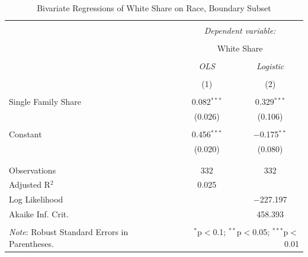 \documentclass[11pt]{article}
\begin{document}
\begin{table}[!htbp] \centering 
  \caption{Bivariate Regressions of White Share on Race, Boundary Subset} 
  \label{tab:naive_biv_causal} 
\begin{tabular}{@{\extracolsep{5pt}}lcc} 
\\[-1.8ex]\hline 
\hline \\[-1.8ex] 
 & \multicolumn{2}{c}{\textit{Dependent variable:}} \\ 
\cline{2-3} 
\\[-1.8ex] & \multicolumn{2}{c}{White Share} \\ 
\\[-1.8ex] & \textit{OLS} & \textit{Logistic} \\ 
\\[-1.8ex] & (1) & (2)\\ 
\hline \\[-1.8ex] 
 Single Family Share & 0.082$^{***}$ & 0.329$^{***}$ \\ 
  & (0.026) & (0.106) \\ 
  & & \\ 
 Constant & 0.456$^{***}$ & $-$0.175$^{**}$ \\ 
  & (0.020) & (0.080) \\ 
  & & \\ 
\hline \\[-1.8ex] 
Observations & 332 & 332 \\ 
Adjusted R$^{2}$ & 0.025 &  \\ 
Log Likelihood &  & $-$227.197 \\ 
Akaike Inf. Crit. &  & 458.393 \\ 
\hline 
\hline \\[-1.8ex] 
\textit{Note}: Robust Standard Errors in Parentheses.  & \multicolumn{2}{r}{$^{*}$p$<$0.1; $^{**}$p$<$0.05; $^{***}$p$<$0.01} \\ 
\end{tabular} 
\end{table} 
\end{document}
